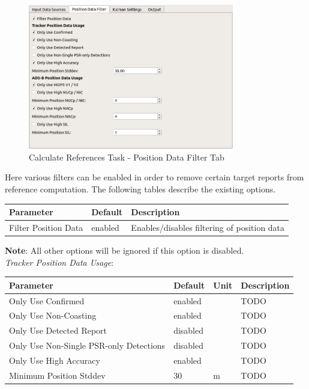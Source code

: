 \begin{figure}[H]
    \center
      \includegraphics[width=9cm]{figures/ui_task_references_tab_filter.png}
    \caption{Calculate References Task - Position Data Filter Tab}
\end{figure}

Here various filters can be enabled in order to remove certain target reports from reference computation. 
The following tables describe the existing options.

\begin{table}[H]
    \center
    \begin{tabularx}{\textwidth}{ | l | l | X |}
        \hline
        \textbf{Parameter} & \textbf{Default} & \textbf{Description} \\ \hline
        Filter Position Data & enabled & Enables/disables filtering of position data \\ \hline
    \end{tabularx}
\end{table}

\textbf{Note}: All other options will be ignored if this option is disabled. \\

\textit{Tracker Position Data Usage}:
\begin{table}[H]
    \center
    \begin{tabularx}{\textwidth}{ | l | l | l | X |}
        \hline
        \textbf{Parameter} & \textbf{Default} & \textbf{Unit} & \textbf{Description} \\ \hline
        Only Use Confirmed & enabled & & TODO \\ \hline
        Only Use Non-Coasting & enabled & & TODO \\ \hline
        Only Use Detected Report & disabled & & TODO \\ \hline
        Only Use Non-Single PSR-only Detections & disabled & & TODO \\ \hline
        Only Use High Accuracy & enabled & & TODO \\ \hline
        Minimum Position Stddev & 30 & m & TODO \\ \hline
    \end{tabularx}
\end{table}

